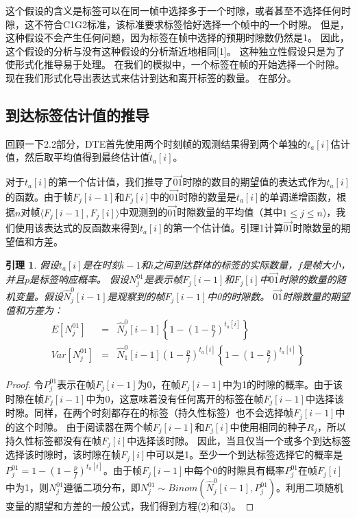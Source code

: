 \documentclass[UTF8]{ctexart}
\newcommand{\RNum}[1]{\uppercase\expandafter{\romannumeral #1\relax}}
\newtheorem{lemma}{引理}
\newtheorem*{proof}{证明}
\begin{document}
	这个假设的含义是标签可以在同一帧中选择多于一个时隙，或者甚至不选择任何时隙，这不符合C1G2标准，该标准要求标签恰好选择一个帧中的一个时隙。 但是，这种假设不会产生任何问题，因为标签在帧中选择的预期时隙数仍然是1。 因此，这个假设的分析与没有这种假设的分析渐近地相同[1]。 这种独立性假设只是为了使形式化推导易于处理。 在我们的模拟中，一个标签在帧的开始选择一个时隙。 现在我们形式化导出表达式来估计到达和离开标签的数量。 在\RNum{4}部分。
	
	\subsection{到达标签估计值的推导}
	回顾一下2.2部分，DTE首先使用两个时刻帧的观测结果得到两个单独的$t_a[i]$估计值，然后取平均值得到最终估计值$\widetilde{t}_a[i]$。
	
	对于$t_a[i]$的第一个估计值，我们推导了$\overrightarrow{01}$时隙的数目的期望值的表达式作为$t_a[i]$的函数。由于帧$F_j[i-1]$和$F_j[i]$中的$\overrightarrow{01}$时隙的数量是$t_a[i]$的单调递增函数，根据$n$对帧$\langle F_j[i-1],F_j[i]\rangle$中观测到的$\overrightarrow{01}$时隙数量的平均值（其中$1\leq j\leq n$)，我们使用该表达式的反函数来得到$t_a[i]$的第一个估计值。引理1计算$\overrightarrow{01}$时隙数量的期望值和方差。
	
	\begin{lemma}
		假设$t_a[i]$是在时刻$i-1$和$i$之间到达群体的标签的实际数量，$f$是帧大小，并且$p$是标签响应概率。 假设$N^{01}_j$是表示帧$F_j[i-1]$和$F_j[i]$中$\overrightarrow{01}$时隙的数量的随机变量。假设$\hat{N}^0_j[i-1]$是观察到的帧$F_j[i-1]$中0的时隙数。 $\overrightarrow{01}$时隙数量的期望值和方差为：
		\begin{eqnarray}
		E[N^{01}_j]&=&\hat{N}^0_j[i-1]\left\{1-\left(1-\frac{p}{f}\right)^{t_a[i]}\right\}\\
		Var[N^{01}_j]&=&\hat{N}^0_1[i-1]\left(1-\frac{p}{f}\right)^{t_a[i]}\left\{1-\left(1-\frac{p}{f}\right)^{t_a[i]}\right\}
		\end{eqnarray}
	\end{lemma}
	
	\begin{proof}
		令$P^{01}_j$表示在帧$F_j[i-1]$为0，在帧$F_j[i-1]$中为1的时隙的概率。由于该时隙在帧$F_j[i-1]$中为0，这意味着没有任何离开的标签在帧$F_j[i-1]$中选择该时隙。同样，在两个时刻都存在的标签（持久性标签）也不会选择帧$F_j[i-1]$中的这个时隙。 由于阅读器在两个帧$F_j[i-1]$和$F_j[i]$中使用相同的种子$R_j$，所以持久性标签都没有在帧$F_j[i]$中选择该时隙。 因此，当且仅当一个或多个到达标签选择该时隙时，该时隙在帧$F_j[i]$中可以是1。至少一个到达标签选择它的概率是$P^01_j=1-\left(1-\frac{p}{f}\right)^{t_a[i]}$。由于帧$F_j[i-1]$中每个0的时隙具有概率$P^{01}_j$在帧$F_j[i]$中为1，则$N^{01}_j$遵循二项分布，即$N^{01}_j\sim Binom(\hat{N}^0_j[i-1],P^{01}_j)$。利用二项随机变量的期望和方差的一般公式，我们得到方程(2)和(3)。
	\end{proof}
	
\end{document}
